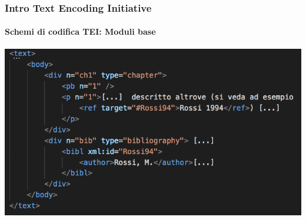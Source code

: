 \begin{frame}
	\frametitle{Intro Text Encoding Initiative}
	\framesubtitle{Schemi di codifica TEI: Moduli base}
	\addtocounter{nframe}{1}

	\begin{center}
		\includegraphics[width=.9\textwidth]{imgs/esempio-attr2.png}
	\end{center}
\end{frame}


    


